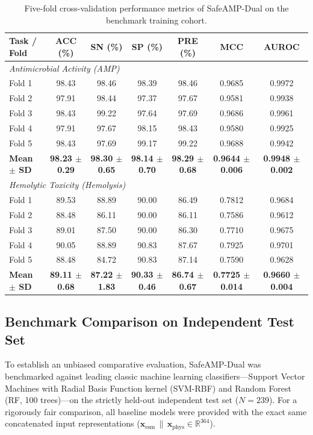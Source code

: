\documentclass[11pt,a4paper]{article}
\begin{document}
\begin{table}[htbp]
\centering
\caption{Five-fold cross-validation performance metrics of SafeAMP-Dual on the benchmark training cohort.}
\label{tab:cross_validation}
\small
\begin{tabular*}{\textwidth}{@{\extracolsep{\fill}}lcccccc@{}}
\toprule
\textbf{Task / Fold} & \textbf{ACC (\%)} & \textbf{SN (\%)} & \textbf{SP (\%)} & \textbf{PRE (\%)} & \textbf{MCC} & \textbf{AUROC} \\
\midrule
\multicolumn{7}{l}{\textit{Antimicrobial Activity (AMP)}} \\
Fold 1 & 98.43 & 98.46 & 98.39 & 98.46 & 0.9685 & 0.9972 \\
Fold 2 & 97.91 & 98.44 & 97.37 & 97.67 & 0.9581 & 0.9938 \\
Fold 3 & 98.43 & 99.22 & 97.64 & 97.69 & 0.9686 & 0.9961 \\
Fold 4 & 97.91 & 97.67 & 98.15 & 98.43 & 0.9580 & 0.9925 \\
Fold 5 & 98.43 & 97.69 & 99.17 & 99.22 & 0.9688 & 0.9942 \\
\textbf{Mean $\pm$ SD} & \textbf{98.23 $\pm$ 0.29} & \textbf{98.30 $\pm$ 0.65} & \textbf{98.14 $\pm$ 0.70} & \textbf{98.29 $\pm$ 0.68} & \textbf{0.9644 $\pm$ 0.006} & \textbf{0.9948 $\pm$ 0.002} \\
\midrule
\multicolumn{7}{l}{\textit{Hemolytic Toxicity (Hemolysis)}} \\
Fold 1 & 89.53 & 88.89 & 90.00 & 86.49 & 0.7812 & 0.9684 \\
Fold 2 & 88.48 & 86.11 & 90.00 & 86.11 & 0.7586 & 0.9612 \\
Fold 3 & 89.01 & 87.50 & 90.00 & 86.30 & 0.7710 & 0.9675 \\
Fold 4 & 90.05 & 88.89 & 90.83 & 87.67 & 0.7925 & 0.9701 \\
Fold 5 & 88.48 & 84.72 & 90.83 & 87.14 & 0.7590 & 0.9628 \\
\textbf{Mean $\pm$ SD} & \textbf{89.11 $\pm$ 0.68} & \textbf{87.22 $\pm$ 1.83} & \textbf{90.33 $\pm$ 0.46} & \textbf{86.74 $\pm$ 0.67} & \textbf{0.7725 $\pm$ 0.014} & \textbf{0.9660 $\pm$ 0.004} \\
\bottomrule
\end{tabular*}
\end{table}

\subsection{Benchmark Comparison on Independent Test Set}
To establish an unbiased comparative evaluation, SafeAMP-Dual was benchmarked against leading classic machine learning classifiers---Support Vector Machines with Radial Basis Function kernel (SVM-RBF) \cite{pedregosa2011scikit} and Random Forest (RF, 100 trees)---on the strictly held-out independent test set ($N = 239$). For a rigorously fair comparison, all baseline models were provided with the exact same concatenated input representations ($\mathbf{x}_{\text{esm}} \,\|\, \mathbf{x}_{\text{phys}} \in \mathbb{R}^{364}$).
\end{document}
